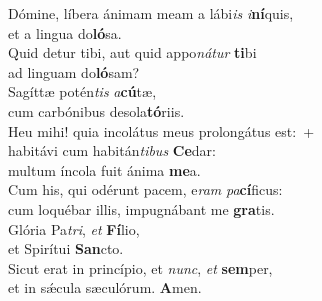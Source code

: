 \evenverse Dómine, líbera ánimam meam a lábi\textit{is} \textit{i}\textbf{ní}quis,~\*\\
\evenverse et a lingua do\textbf{ló}sa.\\
\oddverse Quid detur tibi, aut quid appo\textit{ná}\textit{tur} \textbf{ti}bi~\*\\
\oddverse ad linguam do\textbf{ló}sam?\\
\evenverse Sagíttæ potén\textit{tis} \textit{a}\textbf{cú}tæ,~\*\\
\evenverse cum carbónibus desola\textbf{tó}riis.\\
\oddverse Heu mihi! quia incolátus meus prolongátus est:~+\\
\oddverse  habitávi cum habitán\textit{ti}\textit{bus} \textbf{Ce}dar:~\*\\
\oddverse multum íncola fuit ánima \textbf{me}a.\\
\evenverse Cum his, qui odérunt pacem, e\textit{ram} \textit{pa}\textbf{cí}ficus:~\*\\
\evenverse cum loquébar illis, impugnábant me \textbf{gra}tis.\\
\oddverse Glória Pa\textit{tri}, \textit{et} \textbf{Fí}lio,~\*\\
\oddverse et Spirítui \textbf{San}cto.\\
\evenverse Sicut erat in princípio, et \textit{nunc}, \textit{et} \textbf{sem}per,~\*\\
\evenverse et in sǽcula sæculórum. \textbf{A}men.\\
